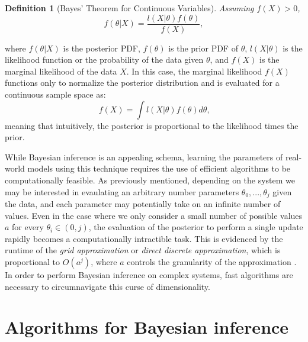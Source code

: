 \documentclass[
  12pt,
]{book}
\theoremstyle{definition}
\newtheorem{definition}{Definition}[chapter]
\theoremstyle{definition}
\theoremstyle{definition}
\theoremstyle{remark}
\begin{document}
\begin{definition}[Bayes' Theorem for Continuous Variables]
\protect\hypertarget{def:bayesprob}{}{\label{def:bayesprob} {} }\emph{Assuming \(f(X)>0\),}
\[f(\theta|X)=\frac{l(X|\theta)f(\theta)}{f(X)},\]
\end{definition}
where \(f(\theta|X)\) is the posterior PDF, \(f(\theta)\) is the prior PDF of \(\theta\), \(l(X|\theta)\) is the likelihood function or the probability of the data given \(\theta\), and \(f(X)\) is the marginal likelihood of the data \(X\).
In this case, the marginal likelihood \(f(X)\) functions only to normalize the posterior distribution and is evaluated for a continuous sample space as:
\[f(X)=\int l(X|\theta)f(\theta)d\theta \textrm{,}\]
meaning that intuitively, the posterior is proportional to the likelihood times the prior.

While Bayesian inference is an appealing schema, learning the parameters of real-world models using this technique requires the use of efficient algorithms to be computationally feasible.
As previously mentioned, depending on the system we may be interested in evaulating an arbitrary number parameters \(\theta_0, ..., \theta_j\) given the data, and each parameter may potentially take on an infinite number of values.
Even in the case where we only consider a small number of possible values \(a\) for every \(\theta_i \in (0,j)\), the evaluation of the posterior to perform a single update rapidly becomes a computationally intractible task.
This is evidenced by the runtime of the \emph{grid approximation} or \emph{direct discrete approximation}, which is proportional to \(O(a^{j})\), where \(a\) controls the granularity of the approximation \citep[  10.1]{Gelman2013}.
In order to perform Bayesian inference on complex systems, fast algorithms are necessary to circumnavigate this curse of dimensionality.

\hypertarget{algorithms-for-bayesian-inference}{%
\chapter{Algorithms for Bayesian inference}\label{algorithms-for-bayesian-inference}}
\end{document}
